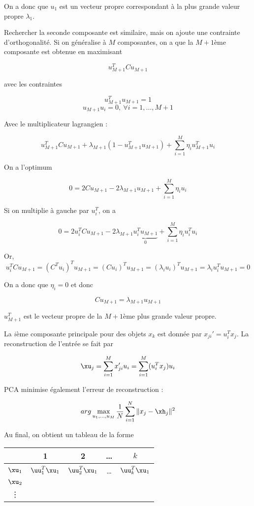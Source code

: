 	On a donc que $u_1$ est un vecteur propre correspondant à la plus grande valeur propre $\lambda_1$.
	
	
	Rechercher la seconde composante est similaire, mais on ajoute une contrainte d'orthogonalité. Si on généralise à $M$ composantes, on a que la $M + 1$ème composante est obtenue en maximisant 
	
	$$u_{M + 1}^T C u_{M + 1}$$
	
	avec les contraintes
	
	$$u_{M + 1}^T u_{M + 1} = 1$$
	$$u_{M + 1} u_i = 0, \: \forall i = 1, \dots , M + 1$$
	
	Avec le multiplicateur lagrangien :
	
	$$u_{M + 1}^T Cu_{M + 1} + \lambda_{M + 1} (1 - u_{M + 1}^T u_{M + 1}) + \sum_{i = 1}^M \eta_i u_{M + 1}^T u_i$$
	
	On a l'optimum
	
	$$0 = 2 C u_{M + 1} - 2 \lambda_{M + 1} u_{M + 1}  +\sum_{i=1}^M \eta_i u_i$$
	
	Si on multiplie à gauche par $u_i^T$, on a
	
	$$0 = 2u_i^T C u_{M + 1} - 2 \lambda_{M + 1} \underbrace{u_i^T u_{M + 1}}_{0}  +\sum_{i=1}^M \eta_i u_i^T u_i$$
	
	Or, 
	$$u_i^TCu_{M + 1} = (C^Tu_i)^Tu_{M + 1} = (Cu_i)^T u_{M + 1} = (\lambda_i u_i)^T u_{M + 1} = \lambda_i u_i^T u_{M + 1} = 0$$
	
	On a donc que $\eta_i = 0$ et donc
	
	$$C u_{M + 1} = \lambda_{M + 1} u_{M + 1}$$
	
	$u_{M + 1}^T$ est le vecteur propre de la $M + 1$ème plus grande valeur propre.
	
	La $i$ème composante principale pour des objets $x_k$ est donnée par $x_{ji}' = u_i^Tx_j$. La reconstruction de l'entrée se fait par
	
	$$\xu_j = \sum_{i = 1}^M x_{ji}' u_i = \sum_{i = 1}^M(u_i^Tx_j)u_i$$
	
	PCA minimise également l'erreur de reconstruction :
	
	$$arg \max_{u_1, \dots , u_M} \frac{1}{N} \sum_{i = 1}^N \Vert x_j - \xh_j \Vert^2$$
	
	
	Au final, on obtient un tableau de la forme
	
	\begin{center}
	\begin{tabular}{c|cccc}
	\hline 
	  & 1 & 2 & \dots & $k$ \\ 
	\hline 
	$\xu_1$ & $\uu_1^T\xu_1$ & $\uu_2^T\xu_1$ & \dots & $\uu_k^T\xu_1$ \\ 
	$\xu_2$ &   &   &   &   \\ 
	\vdots &   &   &   &   \\ 
	\end{tabular} 
	\end{center}
	

